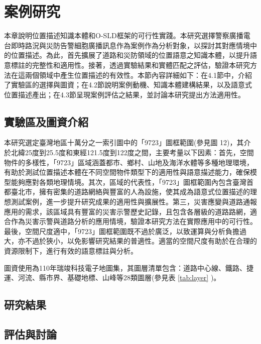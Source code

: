 
\chapter{案例研究}

本章說明位置描述知識本體和O-SLD框架的可行性實踐。本研究選擇警察廣播電台即時路況與災防告警細胞廣播訊息作為案例作為分析對象，以探討其對應情境中的位置描述。為此，首先擴展了道路和災防領域的位置語意之知識本體，以提升語意標註的完整性和適用性。接著，透過實驗結果和實體匹配之評估，驗證本研究方法在這兩個領域中產生位置描述的有效性。本節內容詳細如下：在4.1節中，介紹了實驗區的選擇與圖資；在4.2節說明案例動機、知識本體建構結果，以及語意式位置描述產出；在4.3節呈現案例評估之結果，並討論本研究提出方法適用性。

\section{實驗區及圖資介紹}

本研究選定臺灣地區十萬分之一索引圖中的「9723」圖框範圍(參見圖 12)，其介於北緯25度到25.5度和東經121.5度到122度之間，主要考量以下因素：首先，空間物件的多樣性，「9723」區域涵蓋都市、鄉村、山地及海洋水體等多種地理環境，有助於測試位置描述本體在不同空間物件類型下的適用性與語意描述能力，確保模型能夠應對各類地理情境。其次，區域的代表性，「9723」圖框範圍內包含臺灣首都臺北市，擁有密集的道路網絡與豐富的人為設施，使其成為語意式位置描述的理想測試案例，進一步提升研究成果的適用性與擴展性。第三，災害應變與道路通報應用的需求，該區域具有豐富的災害示警歷史記錄，且包含各層級的道路路網，適合作為災害示警與道路分析的應用情境，驗證本研究方法在實際應用中的可行性。最後，空間尺度適中，「9723」圖框範圍既不過於廣泛，以致運算與分析負擔過大，亦不過於狹小，以免影響研究結果的普適性。適當的空間尺度有助於在合理的資源限制下，進行有效的語意標註與分析。

圖資使用為110年瑞竣科技電子地圖集，其圖層清單包含：道路中心線、鐵路、捷運、河流、縣市界、基礎地標、山峰等28類圖層(參見表 \ref{tab:layer} )。



\section{研究結果}

\section{評估與討論}